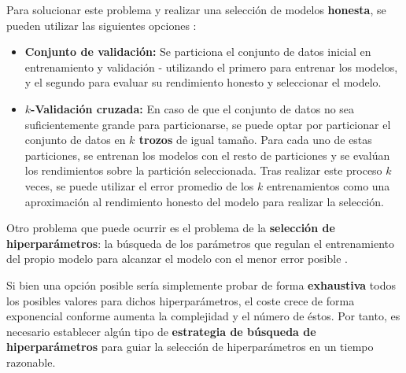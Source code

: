 Para solucionar este problema y realizar una selección de modelos \textbf{honesta}, se pueden utilizar las siguientes opciones \cite{mlprobabilistic}:

\begin{itemize}[parsep=1pt, itemsep=1pt, topsep=4pt]
	\item \textbf{Conjunto de validación:} Se particiona el conjunto de datos inicial en entrenamiento y validación - utilizando el primero para entrenar los modelos, y el segundo para evaluar su rendimiento honesto y seleccionar el modelo.
	\item \textbf{$k$-Validación cruzada:} En caso de que el conjunto de datos no sea suficientemente grande para particionarse, se puede optar por particionar el conjunto de datos en \textbf{$k$ trozos} de igual tamaño. Para cada uno de estas particiones, se entrenan los modelos con el resto de particiones y se evalúan los rendimientos sobre la partición seleccionada. Tras realizar este proceso $k$ veces, se puede utilizar el error promedio de los $k$ entrenamientos como una aproximación al rendimiento honesto del modelo para realizar la selección.
\end{itemize}

Otro problema que puede ocurrir es el problema de la \textbf{selección de hiperparámetros}: la búsqueda de los parámetros que regulan el entrenamiento del propio modelo para alcanzar el modelo con el menor error posible \cite{hyperparameteroptimization}.

Si bien una opción posible sería simplemente probar de forma \textbf{exhaustiva} todos los posibles valores para dichos hiperparámetros, el coste crece de forma exponencial conforme aumenta la complejidad y el número de éstos. Por tanto, es necesario establecer algún tipo de \textbf{estrategia de búsqueda de hiperparámetros} \cite{hyperparameteroptimization} para guiar la selección de hiperparámetros en un tiempo razonable.

